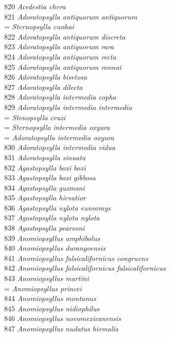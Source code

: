 \documentclass[
]{article}
\begin{document}
820 \emph{Acedestia chera}\\
821 \emph{Adoratopsylla antiquorum antiquorum}\\
= \emph{Sternopsylla cunhai}\\
822 \emph{Adoratopsylla antiquorum discreta}\\
823 \emph{Adoratopsylla antiquorum rara}\\
824 \emph{Adoratopsylla antiquorum recta}\\
825 \emph{Adoratopsylla antiquorum ronnai}\\
826 \emph{Adoratopsylla bisetosa}\\
827 \emph{Adoratopsylla dilecta}\\
828 \emph{Adoratopsylla intermedia copha}\\
829 \emph{Adoratopsylla intermedia intermedia}\\
= \emph{Stenopsylla cruzi}\\
= \emph{Sternopsylla intermedia oxyura}\\
= \emph{Adoratopsylla intermedia oxyura}\\
830 \emph{Adoratopsylla intermedia vidua}\\
831 \emph{Adoratopsylla sinuata}\\
832 \emph{Agastopsylla boxi boxi}\\
833 \emph{Agastopsylla boxi gibbosa}\\
834 \emph{Agastopsylla guzmani}\\
835 \emph{Agastopsylla hirsutior}\\
836 \emph{Agastopsylla nylota euneomys}\\
837 \emph{Agastopsylla nylota nylota}\\
838 \emph{Agastopsylla pearsoni}\\
839 \emph{Anomiopsyllus amphibolus}\\
840 \emph{Anomiopsyllus durangoensis}\\
841 \emph{Anomiopsyllus falsicalifornicus congruens}\\
842 \emph{Anomiopsyllus falsicalifornicus falsicalifornicus}\\
843 \emph{Anomiopsyllus martini}\\
= \emph{Anomiopsyllus princei}\\
844 \emph{Anomiopsyllus montanus}\\
845 \emph{Anomiopsyllus nidiophilus}\\
846 \emph{Anomiopsyllus novomexicanensis}\\
847 \emph{Anomiopsyllus nudatus hiemalis}\\
\end{document}
